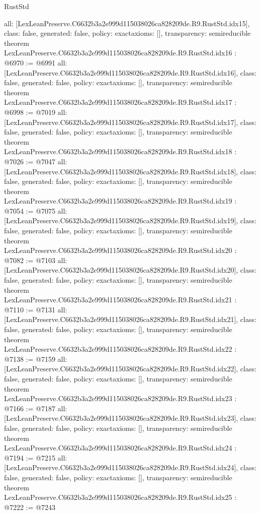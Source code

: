\begin{lexlean}{RustStd}
\begin{coremodule}
{  all: [LexLeanPreserve.C6632b3a2e999d115038026ca828209de.R9.RustStd.idx15],
  class: false,
  generated: false,
  policy: exact{axioms: []},
  transparency: semireducible
}
theorem LexLeanPreserve.C6632b3a2e999d115038026ca828209de.R9.RustStd.idx16 : @6970 := @6991 {
  all: [LexLeanPreserve.C6632b3a2e999d115038026ca828209de.R9.RustStd.idx16],
  class: false,
  generated: false,
  policy: exact{axioms: []},
  transparency: semireducible
}
theorem LexLeanPreserve.C6632b3a2e999d115038026ca828209de.R9.RustStd.idx17 : @6998 := @7019 {
  all: [LexLeanPreserve.C6632b3a2e999d115038026ca828209de.R9.RustStd.idx17],
  class: false,
  generated: false,
  policy: exact{axioms: []},
  transparency: semireducible
}
theorem LexLeanPreserve.C6632b3a2e999d115038026ca828209de.R9.RustStd.idx18 : @7026 := @7047 {
  all: [LexLeanPreserve.C6632b3a2e999d115038026ca828209de.R9.RustStd.idx18],
  class: false,
  generated: false,
  policy: exact{axioms: []},
  transparency: semireducible
}
theorem LexLeanPreserve.C6632b3a2e999d115038026ca828209de.R9.RustStd.idx19 : @7054 := @7075 {
  all: [LexLeanPreserve.C6632b3a2e999d115038026ca828209de.R9.RustStd.idx19],
  class: false,
  generated: false,
  policy: exact{axioms: []},
  transparency: semireducible
}
theorem LexLeanPreserve.C6632b3a2e999d115038026ca828209de.R9.RustStd.idx20 : @7082 := @7103 {
  all: [LexLeanPreserve.C6632b3a2e999d115038026ca828209de.R9.RustStd.idx20],
  class: false,
  generated: false,
  policy: exact{axioms: []},
  transparency: semireducible
}
theorem LexLeanPreserve.C6632b3a2e999d115038026ca828209de.R9.RustStd.idx21 : @7110 := @7131 {
  all: [LexLeanPreserve.C6632b3a2e999d115038026ca828209de.R9.RustStd.idx21],
  class: false,
  generated: false,
  policy: exact{axioms: []},
  transparency: semireducible
}
theorem LexLeanPreserve.C6632b3a2e999d115038026ca828209de.R9.RustStd.idx22 : @7138 := @7159 {
  all: [LexLeanPreserve.C6632b3a2e999d115038026ca828209de.R9.RustStd.idx22],
  class: false,
  generated: false,
  policy: exact{axioms: []},
  transparency: semireducible
}
theorem LexLeanPreserve.C6632b3a2e999d115038026ca828209de.R9.RustStd.idx23 : @7166 := @7187 {
  all: [LexLeanPreserve.C6632b3a2e999d115038026ca828209de.R9.RustStd.idx23],
  class: false,
  generated: false,
  policy: exact{axioms: []},
  transparency: semireducible
}
theorem LexLeanPreserve.C6632b3a2e999d115038026ca828209de.R9.RustStd.idx24 : @7194 := @7215 {
  all: [LexLeanPreserve.C6632b3a2e999d115038026ca828209de.R9.RustStd.idx24],
  class: false,
  generated: false,
  policy: exact{axioms: []},
  transparency: semireducible
}
theorem LexLeanPreserve.C6632b3a2e999d115038026ca828209de.R9.RustStd.idx25 : @7222 := @7243 {
}
\end{coremodule}
\end{lexlean}
